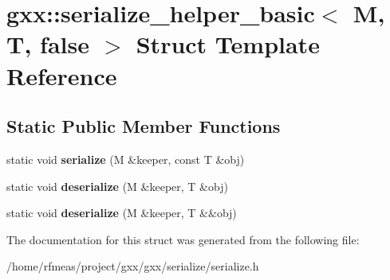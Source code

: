 \hypertarget{structgxx_1_1serialize__helper__basic_3_01M_00_01T_00_01false_01_4}{}\section{gxx\+:\+:serialize\+\_\+helper\+\_\+basic$<$ M, T, false $>$ Struct Template Reference}
\label{structgxx_1_1serialize__helper__basic_3_01M_00_01T_00_01false_01_4}
\subsection*{Static Public Member Functions}
\begin{DoxyCompactItemize}
\item 
static void {\bfseries serialize} (M \&keeper, const T \&obj)\hypertarget{structgxx_1_1serialize__helper__basic_3_01M_00_01T_00_01false_01_4_ad739253864596d272b53ad0590c6c747}{}\label{structgxx_1_1serialize__helper__basic_3_01M_00_01T_00_01false_01_4_ad739253864596d272b53ad0590c6c747}

\item 
static void {\bfseries deserialize} (M \&keeper, T \&obj)\hypertarget{structgxx_1_1serialize__helper__basic_3_01M_00_01T_00_01false_01_4_a0a8e3324fd8435068d2c16f0ded198f8}{}\label{structgxx_1_1serialize__helper__basic_3_01M_00_01T_00_01false_01_4_a0a8e3324fd8435068d2c16f0ded198f8}

\item 
static void {\bfseries deserialize} (M \&keeper, T \&\&obj)\hypertarget{structgxx_1_1serialize__helper__basic_3_01M_00_01T_00_01false_01_4_ad765b783d0075a338157176c20915ce5}{}\label{structgxx_1_1serialize__helper__basic_3_01M_00_01T_00_01false_01_4_ad765b783d0075a338157176c20915ce5}

\end{DoxyCompactItemize}


The documentation for this struct was generated from the following file\+:\begin{DoxyCompactItemize}
\item 
/home/rfmeas/project/gxx/gxx/serialize/serialize.\+h\end{DoxyCompactItemize}
